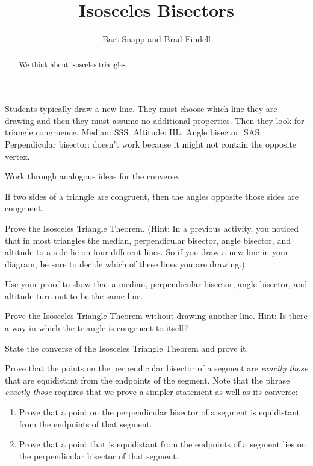 \documentclass[nooutcomes]{ximera}
\title{Isosceles Bisectors}
\author{Bart Snapp and Brad Findell}
\begin{document}
\begin{abstract}
  We think about isosceles triangles.
\end{abstract}
\maketitle

\begin{teachingnote}
Students typically draw a new line. They must choose which line they are drawing and then they must assume no additional properties.  Then they look for triangle congruence.  Median: SSS.  Altitude: HL.  Angle bisector: SAS. Perpendicular bisector: doesn't work because it might not contain the opposite vertex.  

Work through analogous ideas for the converse. 
\end{teachingnote}

\begin{theorem}
If two sides of a triangle are congruent, then the angles opposite those sides are congruent. 
\end{theorem}

\begin{problem}
Prove the Isosceles Triangle Theorem.  (Hint: In a previous activity, you noticed that in most triangles the median, perpendicular bisector, angle bisector, and altitude to a side lie on four different lines.  So if you draw a new line in your diagram, be sure to decide which of these lines you are drawing.)
\vfill
\end{problem}

\begin{problem}
Use your proof to show that a median, perpendicular bisector, angle bisector, and altitude turn out to be the same line.
\vfill
\end{problem}

\newpage
\begin{problem}
Prove the Isosceles Triangle Theorem without drawing another line.  Hint:  Is there a way in which the triangle is congruent to itself? 
\vfill
\end{problem}

\begin{problem}
State the converse of the Isosceles Triangle Theorem and prove it.  
\vfill
\end{problem}

\newpage
\begin{problem}
Prove that the points on the perpendicular bisector of a segment are \emph{exactly those} that are equidistant from the endpoints of the segment.  Note that the phrase \emph{exactly those} requires that we prove a simpler statement as well as its converse:   
\begin{enumerate}
\item Prove that a point on the perpendicular bisector of a segment is equidistant from the endpoints of that segment.
\item Prove that a point that is equidistant from the endpoints of a segment lies on the perpendicular bisector of that segment.
\end{enumerate}
\vfill
\end{problem}
\end{document}
